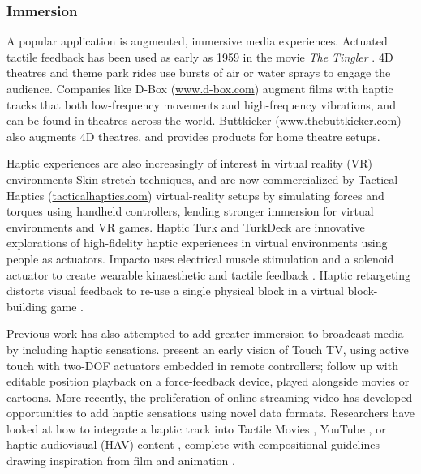 \subsubsection{Immersion}
A popular application is augmented, immersive media experiences.
Actuated tactile feedback has been used as early as 1959 in the movie \emph{The Tingler}  \cite{IJsselsteijn2003}.
4D theatres and theme park rides use bursts of air or water sprays to engage the audience.
Companies like D-Box (\url{www.d-box.com}) augment films with haptic tracks that both low-frequency movements and high-frequency vibrations, and can be found in theatres across the world.
Buttkicker (\url{www.thebuttkicker.com}) also augments 4D theatres, and provides products for home theatre setups.

Haptic experiences are also increasingly of interest in virtual reality (VR) environments 
Skin stretch techniques,  and are now commercialized by Tactical Haptics (\url{tacticalhaptics.com})  virtual-reality setups by simulating forces and torques using handheld controllers, lending stronger immersion for virtual environments and VR games.
Haptic Turk \cite{Cheng2014} and TurkDeck \cite{Cheng2015} are innovative explorations of high-fidelity haptic experiences in virtual environments using people as actuators.
Impacto uses electrical muscle stimulation and a solenoid actuator to create wearable kinaesthetic and tactile feedback \cite{Lopes2015}.
Haptic retargeting distorts visual feedback to re-use a single physical block in a virtual block-building game \cite{Azmandian2016}.

Previous work has also attempted to add greater immersion to broadcast media by including haptic sensations.
\citet{Modhrain2001} present an early vision of Touch TV, using active touch with two-DOF actuators embedded in remote controllers; \citet{Gaw2006} follow up with editable position playback on a force-feedback device, played alongside movies or cartoons.
More recently, the proliferation of online streaming video has developed opportunities to add haptic sensations using novel data formats.
Researchers have looked at how to integrate a haptic track into Tactile Movies \cite{Kim2009}, YouTube  \cite{Gao2013}, or haptic-audiovisual (HAV) content \cite{Danieau2013}, complete with compositional guidelines drawing inspiration from film and animation \cite{Guillotel2016}.

